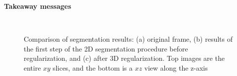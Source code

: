 \documentclass[final,svgnames,dvipsnames,table]{beamer}
\begin{document}
\begin{frame}[fragile]
\begin{columns}[t,totalwidth=\textwidth]
\begin{column}{0.32\textwidth}
\begin{block}{\bf \color{red} Takeaway messages}
\begin{figure}
\hspace{0.2em}
\\
\caption{Comparison of segmentation results: (a) original frame, (b) results of the first step of the 2D segmentation procedure before regularization, and (c) after 3D regularization. Top images are the entire $xy$ slices, and the bottom is a $xz$ view along the z-axis}
\label{fig:compa}
\end{figure}
        \end{block}
%        
%
%
%
%
%
%
%
%  
        
    \end{column}
    
 \end{columns}

  
  

\end{frame}
\end{document}
